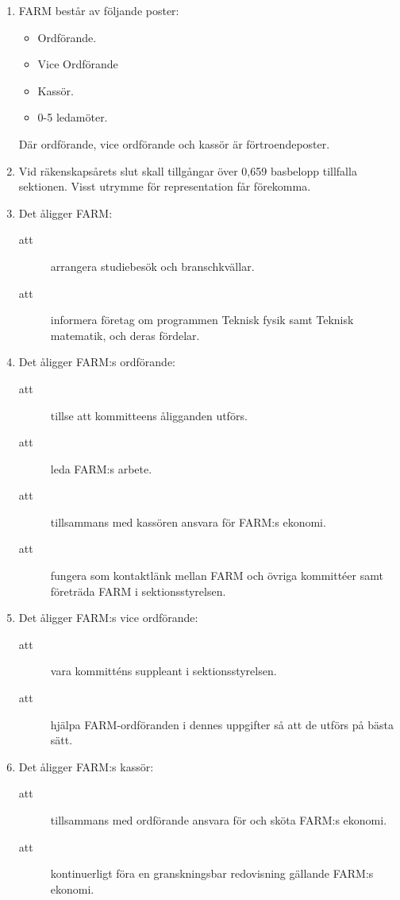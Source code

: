 \documentclass[11pt,a4paper]{article}
\begin{document}
\begin{enumerate}[\thesubsection .1]

  \item FARM består av följande poster:
    \begin{itemize}
	 \item Ordförande.
         \item Vice Ordförande
	 \item Kassör.
	 \item 0-5 ledamöter.
   \end{itemize}
Där ordförande, vice ordförande och kassör är förtroendeposter.
 
  \item Vid räkenskapsårets slut skall tillgångar över 0,659 basbelopp tillfalla sektionen. Visst utrymme för representation får förekomma.

  \item Det åligger FARM:
    \begin{description}
      \item[att] arrangera studiebesök och branschkvällar.   
      \item[att] informera företag om programmen Teknisk fysik samt Teknisk matematik, och deras fördelar.
    \end{description}

  \item Det åligger FARM:s ordförande:
    \begin{description}
      \item[att] tillse att kommitteens åligganden utförs.
      \item[att] leda FARM:s arbete.
      \item[att] tillsammans med kassören ansvara för FARM:s ekonomi.
      \item[att] fungera som kontaktlänk mellan FARM och övriga kommittéer samt företräda FARM i sektionsstyrelsen.
    \end{description}

  \item Det åligger FARM:s vice ordförande:
    \begin{description}
      \item[att] vara kommitténs suppleant i sektionsstyrelsen.
      \item[att] hjälpa FARM-ordföranden i dennes uppgifter så att de utförs på bästa sätt.
    \end{description}

  \item Det åligger FARM:s kassör:
    \begin{description}
      \item[att] tillsammans med ordförande ansvara för och sköta FARM:s ekonomi.
      \item[att] kontinuerligt föra en granskningsbar redovisning gällande FARM:s ekonomi.
    \end{description}


\end{enumerate}
\end{document}
